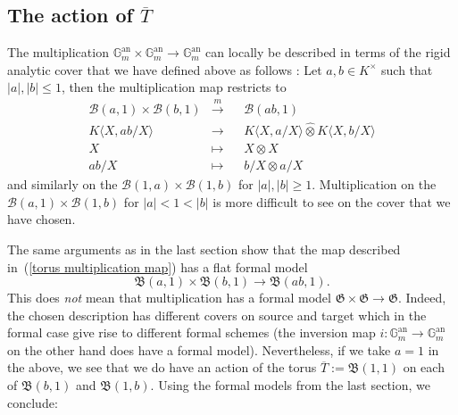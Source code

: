 \documentclass[10pt,oneside]{amsart}
\theoremstyle{definition}
\begin{document}
	\subsection{The action of $\overline{T}$}
	The multiplication $\mathbb G_m^{\operatorname{an}}\times \mathbb G_m^{\operatorname{an}}\rightarrow \mathbb G_m^{\operatorname{an}}$ can locally be described in terms of the rigid analytic cover that we have defined above as follows  : Let $a,b \in K^\times$ such that $|a|,|b|\leq 1$, then the multiplication map restricts to
	\begin{equation}
	\begin{alignedat}{2} \label{torus multiplication map}
	\mathcal B(a,1)\times \mathcal B(b,1)&\xrightarrow{m}&& \mathcal B(ab,1)\\
	K\langle X,ab/X\rangle&\rightarrow &&K\langle X,a/X\rangle\widehat{\otimes} K\langle X,b/X\rangle\\
	X&\mapsto&& X\otimes X\\
	ab/X&\mapsto&& b/X\otimes a/X
	\end{alignedat}
	\end{equation}
	and similarly on the $\mathcal B(1,a)\times \mathcal B(1,b)$ for $|a|,|b|\geq 1$. Multiplication on the $\mathcal B(a,1)\times \mathcal B(1,b)$ for $|a|< 1 < |b|$ is more difficult to see on the cover that we have chosen.
	
	The same arguments as in the last section show that the map described in~(\ref{torus multiplication map}) has a flat formal model
	\[\mathfrak B(a,1)\times \mathfrak B(b,1)\rightarrow \mathfrak B(ab,1).\]
	This does \textit{not} mean that multiplication has a formal model $\mathfrak G\times \mathfrak G\rightarrow \mathfrak G$. Indeed, the chosen description has different covers on source and target which in the formal case give rise to different formal schemes (the inversion map $i:\mathbb G_m^{\operatorname{an}}\rightarrow \mathbb G_m^{\operatorname{an}}$ on the other hand does have a formal model). Nevertheless, if we take $a=1$ in the above, we see that we do have an action of the torus $\overline{T}:=\mathfrak B(1,1)$ on each of $\mathfrak B(b,1)$ and $\mathfrak B(1,b)$. Using the formal models from the last section, we conclude:
	
\end{document}
